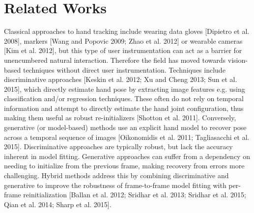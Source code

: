 \section{Related Works}

\begin{DRAFT}
Classical approaches to hand tracking include wearing data gloves [Dipietro et al. 2008], markers [Wang and Popovic 2009; Zhao et al. 2012] or wearable cameras [Kim et al. 2012], but this type of user instrumentation can act as a barrier for unencumbered natural interaction. Therefore the field has moved towards vision-based techniques without direct user instrumentation. Techniques include discriminative approaches [Keskin et al. 2012; Xu and Cheng 2013; Sun et al. 2015], which directly estimate hand pose by extracting image features e.g. using classification and/or regression techniques. These often do not rely on temporal information and attempt to directly estimate the hand joint configuration, thus making them useful as robust re-initializers [Shotton et al. 2011]. Conversely, generative (or model-based) methods use an explicit hand model to recover pose across a temporal sequence of images [Oikonomidis et al. 2011; Tagliasacchi et al. 2015]. Discriminative approaches are typically robust, but lack the accuracy inherent in model fitting. Generative approaches can suffer from a dependency on needing to initialize from the previous frame, making recovery from errors more challenging. Hybrid methods address this by combining discriminative and generative to improve the robustness of frame-to-frame model fitting with per-frame reinitialization [Ballan et al. 2012; Sridhar et al. 2013; Sridhar et al. 2015; Qian et al. 2014; Sharp et al. 2015].


\end{DRAFT}

